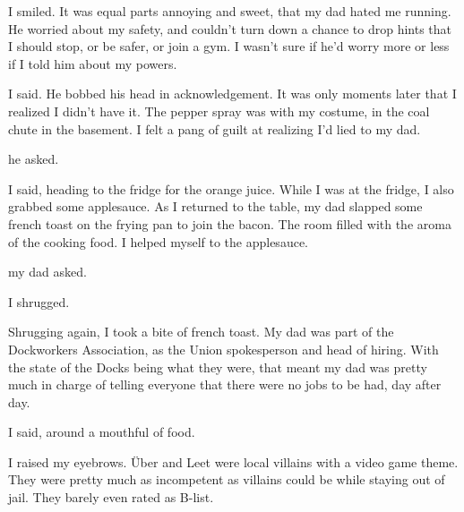 I smiled. It was equal parts annoying and sweet, that my dad hated me running. He worried about my safety, and couldn't turn down a chance to drop hints that I should stop, or be safer, or join a gym. I wasn't sure if he'd worry more or less if I told him about my powers.



 I said. He bobbed his head in acknowledgement. It was only moments later that I realized I didn't have it. The pepper spray was with my costume, in the coal chute in the basement. I felt a pang of guilt at realizing I'd lied to my dad.

 he asked.

 I said, heading to the fridge for the orange juice. While I was at the fridge, I also grabbed some applesauce. As I returned to the table, my dad slapped some french toast on the frying pan to join the bacon. The room filled with the aroma of the cooking food. I helped myself to the applesauce.

 my dad asked.

I shrugged.


Shrugging again, I took a bite of french toast. My dad was part of the Dockworkers Association, as the Union spokesperson and head of hiring. With the state of the Docks being what they were, that meant my dad was pretty much in charge of telling everyone that there were no jobs to be had, day after day.


 I said, around a mouthful of food.


I raised my eyebrows. Über and Leet were local villains with a video game theme. They were pretty much as incompetent as villains could be while staying out of jail. They barely even rated as B-list.


